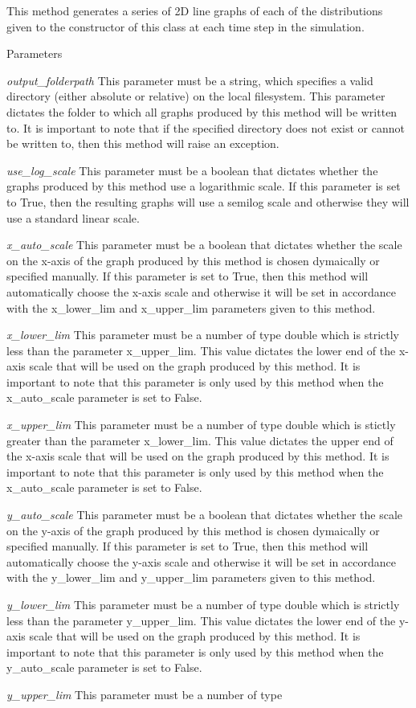 This method generates a series of 2D line graphs of each of the distributions given to the constructor of this class at each time step in the simulation. 


\begin{DoxyParams}{Parameters}
\item[{\em output\_\-folderpath}]This parameter must be a string, which specifies a valid directory (either absolute or relative) on the local filesystem. This parameter dictates the folder to which all graphs produced by this method will be written to. It is important to note that if the specified directory does not exist or cannot be written to, then this method will raise an exception. \item[{\em use\_\-log\_\-scale}]This parameter must be a boolean that dictates whether the graphs produced by this method use a logarithmic scale. If this parameter is set to True, then the resulting graphs will use a semilog scale and otherwise they will use a standard linear scale. \item[{\em x\_\-auto\_\-scale}]This parameter must be a boolean that dictates whether the scale on the x-\/axis of the graph produced by this method is chosen dymaically or specified manually. If this parameter is set to True, then this method will automatically choose the x-\/axis scale and otherwise it will be set in accordance with the x\_\-lower\_\-lim and x\_\-upper\_\-lim parameters given to this method. \item[{\em x\_\-lower\_\-lim}]This parameter must be a number of type double which is strictly less than the parameter x\_\-upper\_\-lim. This value dictates the lower end of the x-\/axis scale that will be used on the graph produced by this method. It is important to note that this parameter is only used by this method when the x\_\-auto\_\-scale parameter is set to False. \item[{\em x\_\-upper\_\-lim}]This parameter must be a number of type double which is stictly greater than the parameter x\_\-lower\_\-lim. This value dictates the upper end of the x-\/axis scale that will be used on the graph produced by this method. It is important to note that this parameter is only used by this method when the x\_\-auto\_\-scale parameter is set to False. \item[{\em y\_\-auto\_\-scale}]This parameter must be a boolean that dictates whether the scale on the y-\/axis of the graph produced by this method is chosen dymaically or specified manually. If this parameter is set to True, then this method will automatically choose the y-\/axis scale and otherwise it will be set in accordance with the y\_\-lower\_\-lim and y\_\-upper\_\-lim parameters given to this method. \item[{\em y\_\-lower\_\-lim}]This parameter must be a number of type double which is strictly less than the parameter y\_\-upper\_\-lim. This value dictates the lower end of the y-\/axis scale that will be used on the graph produced by this method. It is important to note that this parameter is only used by this method when the y\_\-auto\_\-scale parameter is set to False. \item[{\em y\_\-upper\_\-lim}]This parameter must be a number of type 
\end{DoxyParams}
